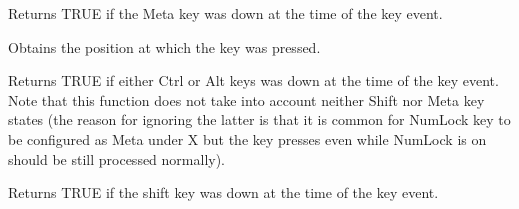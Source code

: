 Returns TRUE if the Meta key was down at the time of the key event.




Obtains the position at which the key was pressed.



Returns TRUE if either {\sc Ctrl} or {\sc Alt} keys was down
at the time of the key event. Note that this function does not take into
account neither {\sc Shift} nor {\sc Meta} key states (the reason for ignoring
the latter is that it is common for {\sc NumLock} key to be configured as 
{\sc Meta} under X but the key presses even while {\sc NumLock} is on should
be still processed normally).



Returns TRUE if the shift key was down at the time of the key event.


